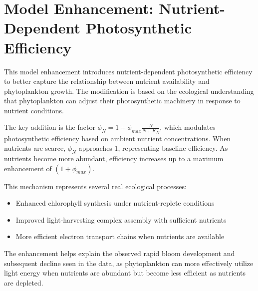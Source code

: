 \section{Model Enhancement: Nutrient-Dependent Photosynthetic Efficiency}

This model enhancement introduces nutrient-dependent photosynthetic efficiency to better capture the relationship between nutrient availability and phytoplankton growth. The modification is based on the ecological understanding that phytoplankton can adjust their photosynthetic machinery in response to nutrient conditions.

The key addition is the factor $\phi_N = 1 + \phi_{max} \frac{N}{N + K_N}$, which modulates photosynthetic efficiency based on ambient nutrient concentrations. When nutrients are scarce, $\phi_N$ approaches 1, representing baseline efficiency. As nutrients become more abundant, efficiency increases up to a maximum enhancement of $(1 + \phi_{max})$.

This mechanism represents several real ecological processes:
\begin{itemize}
    \item Enhanced chlorophyll synthesis under nutrient-replete conditions
    \item Improved light-harvesting complex assembly with sufficient nutrients
    \item More efficient electron transport chains when nutrients are available
\end{itemize}

The enhancement helps explain the observed rapid bloom development and subsequent decline seen in the data, as phytoplankton can more effectively utilize light energy when nutrients are abundant but become less efficient as nutrients are depleted.
